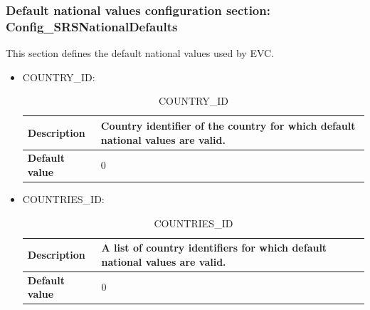 \documentclass{template/openetcs}
\begin{document}
\subsubsection{Default national values configuration section: Config\_SRSNationalDefaults}
	This section defines the default national values used by EVC.
	
	\begin{itemize}
		\item COUNTRY\_ID:
		
			\begin{longtable}{|l|l|}
				\caption{COUNTRY\_ID}\\ 
				\hline
				
					\begin{minipage}[t]{0.22\linewidth} \textbf{Description}	\end{minipage} 
				&	\begin{minipage}[t]{0.78\linewidth} Country identifier of the country for which default national values are valid. \end{minipage} \\
				
				\hline
				
					\begin{minipage}[t]{0.22\linewidth} \textbf{Default value}	\end{minipage} 
				&	\begin{minipage}[t]{0.78\linewidth} 0 \end{minipage} \\
				
				\hline
				
			\end{longtable}
			
		\item COUNTRIES\_ID:
		
			\begin{longtable}{|l|l|}
				\caption{COUNTRIES\_ID}\\ 
				\hline
				
					\begin{minipage}[t]{0.22\linewidth} \textbf{Description}	\end{minipage} 
				&	\begin{minipage}[t]{0.78\linewidth} A list of country identifiers for which default national values are valid. \end{minipage} \\
				
				\hline
				
					\begin{minipage}[t]{0.22\linewidth} \textbf{Default value}	\end{minipage} 
				&	\begin{minipage}[t]{0.78\linewidth} 0 \end{minipage} \\
				

\end{longtable}
\end{itemize}
\end{document}
